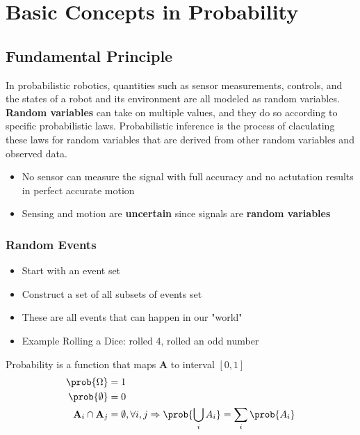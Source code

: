 \section{Basic Concepts in Probability}

\subsection{Fundamental Principle}

In probabilistic robotics, quantities such as sensor measurements, controls, and the states of a robot and its environment are all modeled as random variables.
\textbf{Random variables} can take on multiple values, and they do so according to specific probabilistic laws.
Probabilistic inference is the process of claculating these laws for random variables that are derived from other random variables and observed data.
\begin{itemize}
  \item No sensor can measure the signal with full accuracy and no actutation results in perfect accurate motion
  \item Sensing and motion are \textbf{uncertain} since signals are \textbf{random variables}
\end{itemize}

\subsubsection{Random Events}

\begin{itemize}
  \item Start with an event set
  \item Construct a set of all subsets of events set
  \item These are all events that can happen in our "world"
  \item Example Rolling a Dice: rolled 4, rolled an odd number
\end{itemize}

\begin{definition}[Probability]
  Probability is a function that maps \textbf{A} to interval $[0,1]$
  \begin{align}
    \prob{\Omega} &= 1 \\
    \prob{\emptyset} &= 0 \\
    \textbf{A}_i \cap \textbf{A}_j &= \emptyset, \forall i,j \Rightarrow \prob{\bigcup_{i}A_i} = \sum_{i}{\prob{A_i}}
  \end{align}
\end{definition}

